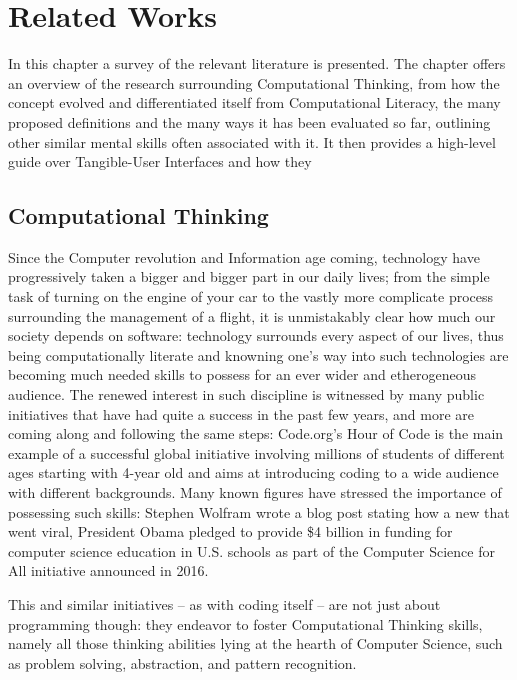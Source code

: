 %
\chapter{Related Works}\label{sec:related}


In this chapter a survey of the relevant literature is presented. The chapter offers an overview of the research surrounding Computational Thinking, from how the concept evolved and differentiated itself from Computational Literacy, the many proposed definitions and the many ways it has been evaluated so far, outlining other similar mental skills often associated with it. It then provides a high-level guide over Tangible-User Interfaces and how they 

\section{Computational Thinking} %
Since the Computer revolution and Information age coming, technology have progressively taken a bigger and bigger part in our daily lives; from the simple task of turning on the engine of your car to the vastly more complicate process surrounding the management of a flight, it is unmistakably clear how much our society depends on software: technology surrounds every aspect of our lives, thus being computationally literate and knowning one's way into such technologies are becoming much needed skills to possess for an ever wider and etherogeneous audience. The renewed interest in such discipline is witnessed by many public initiatives that have had quite a success in the past few years, and more are coming along and following the same steps: Code.org’s Hour of Code is the main example of a successful global initiative involving millions of students of different ages starting with 4-year old and aims at introducing coding to a wide audience with different backgrounds. Many known figures have stressed the importance of possessing such skills: Stephen Wolfram wrote a blog post stating how a new that went viral, President Obama pledged to provide \$4 billion in funding for computer science education in U.S. schools as part of the Computer Science for All initiative announced in 2016.

This and similar initiatives – as with coding itself – are not just about programming though: they endeavor to foster Computational Thinking skills, namely all those thinking abilities lying at the hearth of Computer Science, such as problem solving, abstraction, and pattern recognition.

